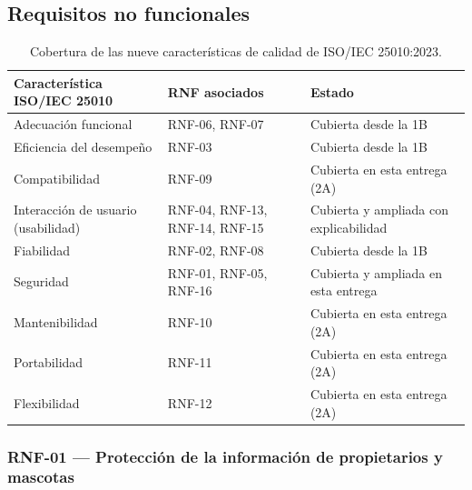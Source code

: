 \documentclass[journal,onecolumn]{IEEEtran}
\begin{document}
	\subsection{Requisitos no funcionales}
	\label{sec:rnf}
	
	\begin{table}[H]
		\centering
		\caption{Cobertura de las nueve características de calidad de ISO/IEC 25010:2023.}
		\label{tab:cobertura-25010}
		\small
		\begin{tabularx}{\textwidth}{@{}p{5.2cm} p{3.2cm} X@{}}
			\toprule
			\textbf{Característica ISO/IEC 25010} & \textbf{RNF asociados} & \textbf{Estado} \\
			\midrule
			Adecuación funcional & RNF-06, RNF-07 & Cubierta desde la 1B \\
			Eficiencia del desempeño & RNF-03 & Cubierta desde la 1B \\
			Compatibilidad & RNF-09 & Cubierta en esta entrega (2A) \\
			Interacción de usuario (usabilidad) & RNF-04, RNF-13, RNF-14, RNF-15 & Cubierta y ampliada con explicabilidad \\
			Fiabilidad & RNF-02, RNF-08 & Cubierta desde la 1B \\
			Seguridad & RNF-01, RNF-05, RNF-16 & Cubierta y ampliada en esta entrega \\
			Mantenibilidad & RNF-10 & Cubierta en esta entrega (2A) \\
			Portabilidad & RNF-11 & Cubierta en esta entrega (2A) \\
			Flexibilidad & RNF-12 & Cubierta en esta entrega (2A) \\
			\bottomrule
		\end{tabularx}
	\end{table}
	
	\subsubsection{RNF-01 --- Protección de la información de propietarios y mascotas}
	
\end{document}
